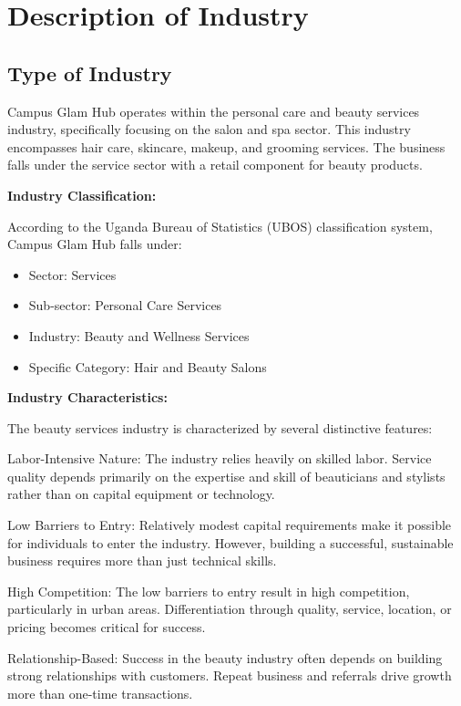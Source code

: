 \section{Description of Industry}

\subsection{Type of Industry}

Campus Glam Hub operates within the personal care and beauty services industry, specifically focusing on the salon and spa sector. This industry encompasses hair care, skincare, makeup, and grooming services. The business falls under the service sector with a retail component for beauty products.

\textbf{Industry Classification:}

According to the Uganda Bureau of Statistics (UBOS) classification system, Campus Glam Hub falls under:
\begin{itemize}[leftmargin=2em]
    \item Sector: Services
    \item Sub-sector: Personal Care Services
    \item Industry: Beauty and Wellness Services
    \item Specific Category: Hair and Beauty Salons
\end{itemize}

\textbf{Industry Characteristics:}

The beauty services industry is characterized by several distinctive features:

Labor-Intensive Nature: The industry relies heavily on skilled labor. Service quality depends primarily on the expertise and skill of beauticians and stylists rather than on capital equipment or technology.

Low Barriers to Entry: Relatively modest capital requirements make it possible for individuals to enter the industry. However, building a successful, sustainable business requires more than just technical skills.

High Competition: The low barriers to entry result in high competition, particularly in urban areas. Differentiation through quality, service, location, or pricing becomes critical for success.

Relationship-Based: Success in the beauty industry often depends on building strong relationships with customers. Repeat business and referrals drive growth more than one-time transactions.

